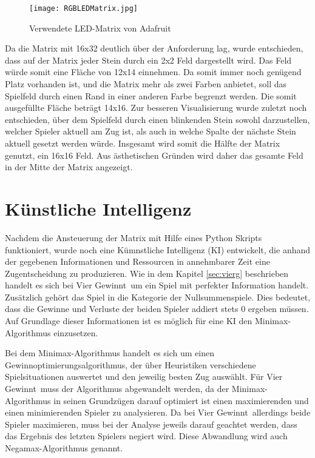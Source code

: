 \begin{figure}[!hbt]
	\centering
	\texttt{[image: RGBLEDMatrix.jpg]}
	\caption{Verwendete LED-Matrix von Adafruit}
\end{figure}

Da die Matrix mit 16x32 deutlich über der Anforderung lag, wurde entschieden, dass auf der Matrix jeder Stein durch ein 2x2 Feld  dargestellt wird.
Das Feld würde somit eine Fläche von 12x14 einnehmen. Da somit immer noch genügend Platz vorhanden ist, und die Matrix mehr als zwei Farben anbietet, soll das Spielfeld durch einen Rand in einer anderen Farbe begrenzt werden.
Die somit ausgefüllte Fläche beträgt 14x16.
Zur besseren Visualisierung wurde zuletzt noch entschieden, über dem Spielfeld durch einen blinkenden Stein sowohl darzustellen, welcher Spieler aktuell am Zug ist, als auch in welche Spalte der nächste Stein aktuell gesetzt werden würde.
Insgesamt wird somit die Hälfte der Matrix genutzt, ein 16x16 Feld.
Aus ästhetischen Gründen wird daher das gesamte Feld in der Mitte der Matrix angezeigt.

\section{Künstliche Intelligenz}
Nachdem die Ansteuerung der Matrix mit Hilfe eines Python Skripts funktioniert, wurde noch eine Kümnstliche Intelligenz (KI) entwickelt, die anhand der gegebenen Informationen und Ressourcen in annehmbarer Zeit eine Zugentscheidung zu produzieren.
Wie in dem Kapitel \ref{sec:vierg} beschrieben handelt es sich bei \glqq Vier Gewinnt\grqq ~um ein Spiel mit perfekter Information handelt. Zusätzlich gehört das Spiel in die Kategorie der Nullsummenspiele. Dies bedeutet, dass die Gewinne und Verluste der beiden Spieler addiert stets 0 ergeben müssen.
Auf Grundlage dieser Informationen ist es möglich für eine KI den Minimax-Algorithmus einzusetzen.

Bei dem Minimax-Algorithmus handelt es sich um einen Gewinnoptimierungsalgorithmus, der über Heuristiken verschiedene Spielsituationen auswertet und den jeweilig besten Zug auswählt.
Für \glqq Vier Gewinnt\grqq ~muss der Algorithmus abgewandelt werden, da der Minimax-Algorithmus in seinen Grundzügen darauf optimiert ist einen maximierenden und einen minimierenden Spieler zu analysieren. Da bei \glqq Vier Gewinnt\grqq ~allerdings beide Spieler maximieren, muss bei der Analyse jeweils darauf geachtet werden, dass das Ergebnis des letzten Spielers negiert wird. Diese Abwandlung wird auch Negamax-Algorithmus genannt.

